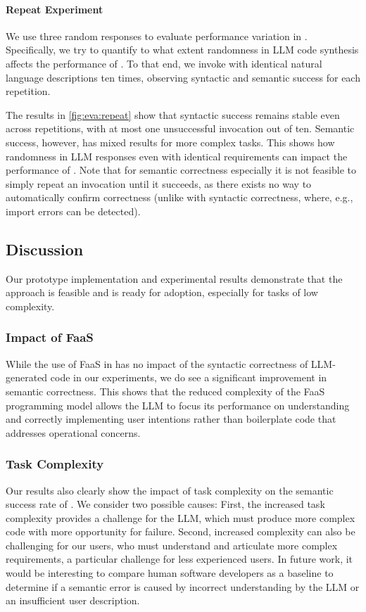 \paragraph{Repeat Experiment}
\label{sec:eva:result:repeat}

We use three random responses to evaluate performance variation in \sysname{}.
Specifically, we try to quantify to what extent randomness in LLM code synthesis affects the performance of \sysname{}.
To that end, we invoke \sysname{} with identical natural language descriptions ten times, observing syntactic and semantic success for each repetition.

The results in \cref{fig:eva:repeat} show that syntactic success remains stable even across repetitions, with at most one unsuccessful invocation out of ten.
Semantic success, however, has mixed results for more complex tasks.
This shows how randomness in LLM responses even with identical requirements can impact the performance of \sysname{}.
Note that for semantic correctness especially it is not feasible to simply repeat an invocation until it succeeds, as there exists no way to automatically confirm correctness (unlike with syntactic correctness, where, e.g., import errors can be detected).




\subsection{Discussion}
\label{sec:eva:discussion}

Our prototype implementation and experimental results demonstrate that the \sysname{} approach is feasible and is ready for adoption, especially for tasks of low complexity.

\subsubsection{Impact of FaaS}
While the use of FaaS in \sysname{} has no impact of the syntactic correctness of LLM-generated code in our experiments, we do see a significant improvement in semantic correctness.
This shows that the reduced complexity of the FaaS programming model allows the LLM to focus its performance on understanding and correctly implementing user intentions rather than boilerplate code that addresses operational concerns.

\subsubsection{Task Complexity}
Our results also clearly show the impact of task complexity on the semantic success rate of \sysname{}.
We consider two possible causes:
First, the increased task complexity provides a challenge for the LLM, which must produce more complex code with more opportunity for failure.
Second, increased complexity can also be challenging for our users, who must understand and articulate more complex requirements, a particular challenge for less experienced users.
In future work, it would be interesting to compare human software developers as a baseline to determine if a semantic error is caused by incorrect understanding by the LLM or an insufficient user description.

